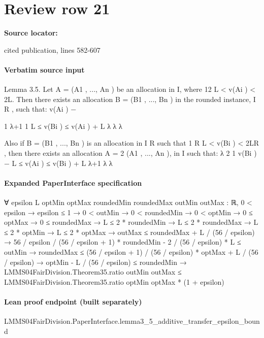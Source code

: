 \documentclass[10pt]{article}
\begin{document}
\section*{Review row 21}
\textbf{Source locator:} {\footnotesize\raggedright cited publication, lines 582-\allowbreak{}607\par}
\paragraph{Verbatim source input}
\begin{ReviewVerbatim}
Lemma 3.5. Let A = (A1 , ..., An ) be an allocation in I,
where 12 L < v(Ai ) < 2L. Then there exists an allocation
B = (B1 , ..., Bn ) in the rounded instance, I R , such that:
v(Ai ) −

1
λ+1
1
L ≤ v(Bi ) ≤
v(Ai ) + L
λ
λ
λ

Also if B = (B1 , ..., Bn ) is an allocation in I R such that
1 R
L < v(Bi ) < 2LR , then there exists an allocation A =
2
(A1 , ..., An ), in I such that:
λ
2
1
v(Bi ) − L ≤ v(Ai ) ≤ v(Bi ) + L
λ+1
λ
λ
\end{ReviewVerbatim}


\paragraph{Expanded PaperInterface specification}
\begin{ReviewVerbatim}
∀ {epsilon L optMin optMax roundedMin roundedMax outMin outMax : ℝ},
  0 < epsilon →
    epsilon ≤ 1 →
      0 < outMin →
        0 < roundedMin →
          0 < optMin →
            0 ≤ optMax →
              0 ≤ roundedMax →
                L ≤ 2 * roundedMin →
                  L ≤ 2 * roundedMax →
                    L ≤ 2 * optMin →
                      L ≤ 2 * optMax →
                        outMax ≤ roundedMax + L / (56 / epsilon) →
                          56 / epsilon / (56 / epsilon + 1) * roundedMin - 2 / (56 / epsilon) * L ≤ outMin →
                            roundedMax ≤ (56 / epsilon + 1) / (56 / epsilon) * optMax + L / (56 / epsilon) →
                              optMin - L / (56 / epsilon) ≤ roundedMin →
                                LMMS04FairDivision.Theorem35.ratio outMin outMax ≤
                                  LMMS04FairDivision.Theorem35.ratio optMin optMax * (1 + epsilon)
\end{ReviewVerbatim}

\paragraph{Lean proof endpoint (built separately)}\begin{ReviewVerbatim}
LMMS04FairDivision.PaperInterface.lemma3_5_additive_transfer_epsilon_bound
\end{ReviewVerbatim}
\end{document}
